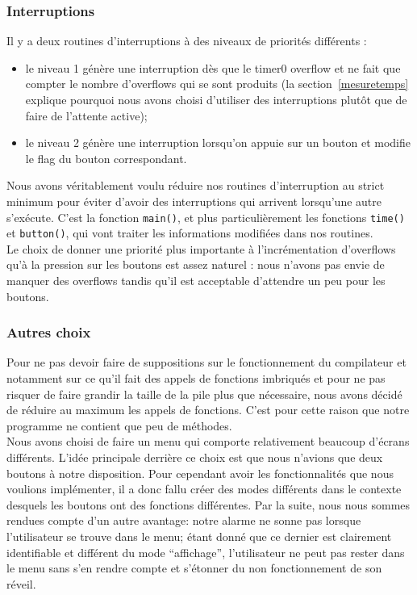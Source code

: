 \documentclass[12pt,a4paper]{article}
\begin{document}
    \subsubsection{Interruptions}
    Il y a deux routines d'interruptions à des niveaux de priorités différents :
    \begin{itemize}
    \item le niveau 1 génère une interruption dès que le timer0 overflow et ne fait que compter le nombre d'overflows qui se sont produits (la section~\ref{mesuretemps} explique pourquoi nous avons choisi d'utiliser des interruptions plutôt que de faire de l'attente active);
    \item le niveau 2 génère une interruption lorsqu'on appuie sur un bouton et modifie le flag du bouton correspondant.\\
    \end{itemize}
    
 	Nous avons véritablement voulu réduire nos routines d'interruption au strict minimum pour éviter d'avoir des interruptions qui arrivent lorsqu'une autre s'exécute. C'est la fonction \texttt{main()}, et plus particulièrement les fonctions \texttt{time()} et \texttt{button()}, qui vont traiter les informations modifiées dans nos routines.\\
	
	Le choix de donner une priorité plus importante à l'incrémentation d'overflows qu'à la pression sur les boutons est assez naturel : nous n'avons pas envie de manquer des overflows tandis qu'il est acceptable d'attendre un peu pour les boutons.

    \subsubsection{Autres choix}
    Pour ne pas devoir faire de suppositions sur le fonctionnement du compilateur et notamment sur ce qu'il fait des appels de fonctions imbriqués et pour ne pas risquer de faire grandir la taille de la pile plus que nécessaire, nous avons décidé de réduire au maximum les appels de fonctions. C'est pour cette raison que notre programme ne contient que peu de méthodes.\\
    
    Nous avons choisi de faire un menu qui comporte relativement beaucoup d'écrans différents.  L'idée principale derrière ce choix est que nous n'avions que deux boutons à notre disposition. Pour cependant avoir les fonctionnalités que nous voulions implémenter, il a donc fallu créer des modes différents dans le contexte desquels les boutons ont des fonctions différentes. Par la suite, nous nous sommes rendues compte d'un autre avantage: notre alarme ne sonne pas lorsque l'utilisateur se trouve dans le menu; étant donné que ce dernier est clairement identifiable et différent du mode ``affichage'', l'utilisateur ne peut pas rester dans le menu sans s'en rendre compte et s'étonner du non fonctionnement de son réveil.\\
\end{document}
